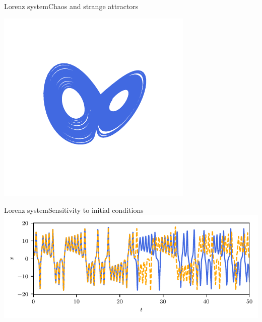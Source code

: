\documentclass[usenames,dvipsnames,svgnames,10pt,aspectratio=169]{beamer}
\begin{document}
\begin{frame}[t, c]{Lorenz system}{Chaos and strange attractors}
	\begin{minipage}{.48\textwidth}
		\centering
		\includegraphics[width=.8\textwidth]{strange_attractor}
	\end{minipage}%
	\hfill
	\begin{minipage}{.48\textwidth}

	\end{minipage}

	\vspace{1cm}
\end{frame}

\begin{frame}[t, c]{Lorenz system}{Sensitivity to initial conditions}
	\centering
	\includegraphics[width=.75\textwidth]{sensitivity_initial_conditions}

	\vspace{1cm}
\end{frame}
\end{document}
